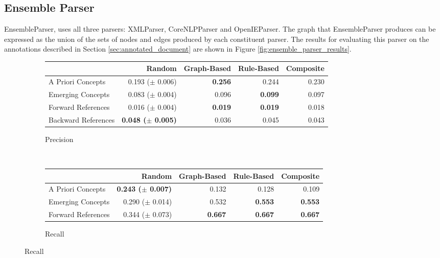 \documentclass[12pt]{article}
\theoremstyle{grammarstyle}
\begin{document}
\subsection{Ensemble Parser}
EnsembleParser, uses all three parsers: XMLParser, CoreNLPParser and OpenIEParser.
The graph that EnsembleParser produces can be expressed as the union of the sets of nodes and edges produced by each constituent parser. The results for evaluating this parser on the annotations described in Section \ref{sec:annotated_document} are shown in Figure \ref{fig:ensemble_parser_results}.
\begin{figure}[h]
    \centering
    \begin{subfigure}[b]{\textwidth}
        \caption{Precision}
        \label{fig:ensemble_precision}
        \centering
        \begin{tabular}{|l|r|r|r|r|}
            \hline
            {} & Random & Graph-Based & Rule-Based & Composite \\
            \hline
            A Priori Concepts & 0.193 ($\pm$ 0.006) &        \textbf{0.256} & 0.244 & 0.230 \\
            Emerging Concepts & 0.083 ($\pm$ 0.004) & 0.096 &       \textbf{0.099} & 0.097 \\
            \hline
            Forward References & 0.016 ($\pm$ 0.004) &        \textbf{0.019} &       \textbf{0.019} & 0.018 \\
            Backward References &  \textbf{0.048 ($\pm$ 0.005)} & 0.036 & 0.045 & 0.043 \\
            \hline
        \end{tabular}
    \end{subfigure} \\
    \begin{subfigure}[b]{\textwidth}
        \caption{Recall}
        \label{fig:ensemble_recall}
        \centering
        \begin{tabular}{|l|r|r|r|r|}
            \hline
            {} & Random & Graph-Based & Rule-Based & Composite \\
            \hline
            A Priori Concepts &  \textbf{0.243 ($\pm$ 0.007)} & 0.132 & 0.128 & 0.109 \\
            Emerging Concepts & 0.290 ($\pm$ 0.014) & 0.532 &       \textbf{0.553} &      \textbf{0.553} \\
            \hline
            Forward References & 0.344 ($\pm$ 0.073) &        \textbf{0.667} &       \textbf{0.667} &      \textbf{0.667} \\

\end{tabular}
\end{subfigure}
\end{figure}
\end{document}
